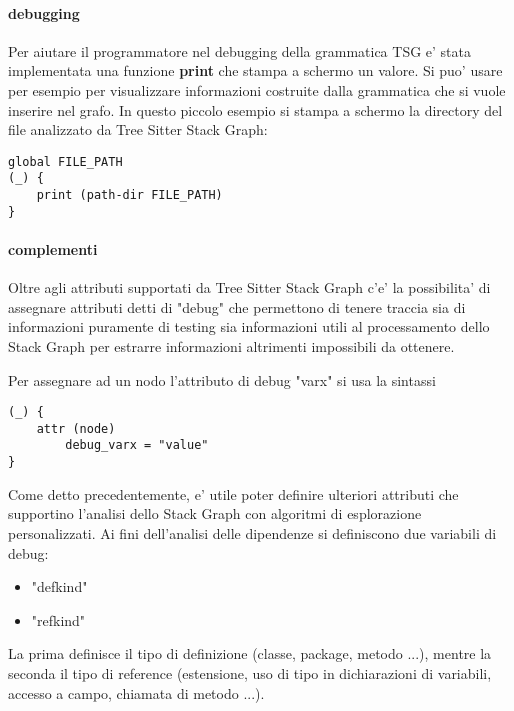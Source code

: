\paragraph{debugging}

Per aiutare il programmatore nel debugging della grammatica TSG e' stata implementata una funzione \textbf{print} che stampa a schermo un valore.
Si puo' usare per esempio per visualizzare informazioni costruite dalla grammatica che si vuole inserire nel grafo.
In questo piccolo esempio si stampa a schermo la directory del file analizzato da Tree Sitter Stack Graph:

\begin{verbatim}
global FILE_PATH
(_) {
    print (path-dir FILE_PATH)
}
\end{verbatim}

\paragraph{complementi}

Oltre agli attributi supportati da Tree Sitter Stack Graph c'e' la possibilita' di assegnare attributi detti di "debug" che permettono di tenere traccia sia di informazioni puramente di testing sia informazioni utili al processamento dello Stack Graph per estrarre informazioni altrimenti impossibili da ottenere.

Per assegnare ad un nodo l'attributo di debug "varx" si usa la sintassi

\begin{verbatim}
(_) {
    attr (node)
        debug_varx = "value"
}
\end{verbatim}

Come detto precedentemente, e' utile poter definire ulteriori attributi che supportino l'analisi dello Stack Graph con algoritmi di esplorazione personalizzati.
Ai fini dell'analisi delle dipendenze si definiscono due variabili di debug:

\begin{itemize}
    \item "defkind"
    \item "refkind"
\end{itemize}

La prima definisce il tipo di definizione (classe, package, metodo ...), mentre la seconda il tipo di reference (estensione, uso di tipo in dichiarazioni di variabili, accesso a campo, chiamata di metodo ...).
